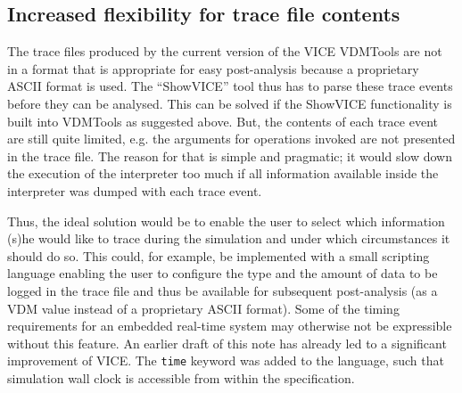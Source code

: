 \subsection{Increased flexibility for trace file contents}

The trace files produced by the current version of the VICE VDMTools
are not in a format that is appropriate for easy post-analysis because
a proprietary ASCII format is used. The ``ShowVICE'' tool thus has to
parse these trace events before they can be analysed. This
can be solved if the ShowVICE functionality is built into VDMTools as
suggested above. But, the contents of each trace event are still quite
limited, e.g. the arguments for operations invoked are not presented in
the trace file. The reason for that is simple and pragmatic; it would
slow down the execution of the interpreter too much if all information
available inside the interpreter was dumped with each trace event.

Thus, the ideal solution would be to enable the user to select which
information (s)he would like to trace during the simulation and under which
circumstances it should do so. This could, for example, be implemented with
a small scripting language enabling the user to configure the type and the
amount of data to be logged in the trace file and thus be available for
subsequent post-analysis (as a VDM value instead of a proprietary ASCII
format). Some of the timing requirements for an embedded real-time system
may otherwise not be expressible without this feature. An earlier draft of
this note has already led to a significant improvement of VICE. The
\verb+time+ keyword was added to the language, such that simulation
wall clock is accessible from within the specification.


